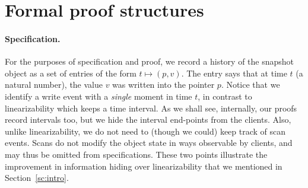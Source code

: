 \section{Formal proof structures}
\label{sc:formal}

\def\histx{\hist_\x}
\def\histy{\hist_\y}
\def\histp{\hist_p}
\def\ordlist{L}
\renewcommand{\tleq}{\mathrel{\leq_\ordlist}}
\renewcommand{\tle}{\mathrel{<_\ordlist}}
\newcommand{\E}{E}
\newcommand{\C}{C}
\newcommand{\sx}{S_\x}
\newcommand{\sy}{S_\y}
\newcommand{\spp}{S_p}
\newcommand{\sss}{S_s}
\newcommand{\wx}{W_\x}
\newcommand{\wy}{W_\y}
\newcommand{\wpp}{W_p}
\newcommand{\admissible}{\mathsf{fine}}

\def\toff{t_{\mathsf{off}}}
\newcommand{\wInit}{\mathsf{W_{off}}}
\newcommand{\wWrite}{\mathsf{New}}
\newcommand{\wDirty}{\mathsf{NeedsFwd}}
\newcommand{\wClean}{\mathsf{Done}}
\newcommand{\sOn}{\mathsf{S_{on}}}
\newcommand{\sOff}{\mathsf{S_{off}}}


\paragraph*{Specification.}
%
For the purposes of specification and proof, we record a history of
the snapshot object as a set of entries of the form $t \mapsto (p,
v)$. The entry says that at time $t$ (a natural number), the value $v$
was written into the pointer $p$. Notice that we identify a write
event with a \emph{single} moment in time $t$, in contrast to
linearizability which keeps a time interval. As we shall see,
internally, our proofs record intervals too, but we hide the interval
end-points from the clients. Also, unlike linearizability, we do not
need to (though we could) keep track of scan events. Scans do not
modify the object state in ways observable by clients, and may thus be
omitted from specifications. These two points illustrate the
improvement in information hiding over linearizability that we
mentioned in Section~\ref{sc:intro}.


